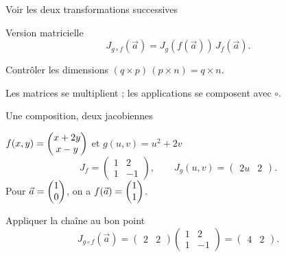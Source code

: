 \begin{frame}[t]{Voir les deux transformations successives}
\coursanalyse
\begin{center}\end{center}
\begin{theoreme}{Version matricielle}
\[J_{g\circ f}(\vec a)=J_g(f(\vec a))\,J_f(\vec a).\]
\end{theoreme}
\begin{resultat}{Contrôler les dimensions}
$(q\times p)\,(p\times n)=q\times n$.

\medskip
Les matrices se multiplient ; les applications se composent avec $\circ$.
\end{resultat}
\end{frame}

\begin{frame}[t]{Une composition, deux jacobiennes}
\coursanalyse
\begin{exemple}{$f(x,y)=\begin{pmatrix}x+2y\\x-y\end{pmatrix}$ et $g(u,v)=u^2+2v$}
\[J_f=\begin{pmatrix}1&2\\1&-1\end{pmatrix},\qquad J_g(u,v)=\begin{pmatrix}2u&2\end{pmatrix}.\]
Pour $\vec a=\begin{pmatrix}1\\0\end{pmatrix}$, on a $f(\vec a)=\begin{pmatrix}1\\1\end{pmatrix}$.
\end{exemple}
\begin{resultat}{Appliquer la chaîne au bon point}
\[J_{g\circ f}(\vec a)=\begin{pmatrix}2&2\end{pmatrix}\begin{pmatrix}1&2\\1&-1\end{pmatrix}=\begin{pmatrix}4&2\end{pmatrix}.\]
\end{resultat}
\end{frame}

